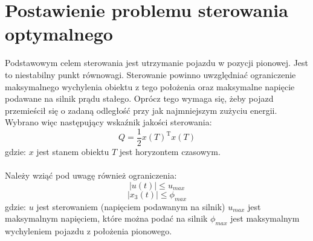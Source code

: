 \section{Postawienie problemu sterowania optymalnego}
\label{sec:sterowanie_optymalne}

Podstawowym celem sterowania jest utrzymanie pojazdu w pozycji pionowej. Jest to niestabilny punkt równowagi. Sterowanie powinno uwzględniać ograniczenie maksymalnego wychylenia obiektu z tego położenia oraz maksymalne napięcie podawane na silnik prądu stałego. Oprócz tego wymaga się, żeby pojazd przemieścił się o zadaną odległość przy jak najmniejszym zużyciu energii. Wybrano więc następujący wskaźnik jakości sterowania:
\begin{equation}
Q=\frac{1}{2}x(T)^\text{T}x(T)
\end{equation}
\noindent gdzie:\newline
\(x\) jest stanem obiektu\newline
\(T\) jest horyzontem czasowym.

\paragraph*{}
Należy wziąć pod uwagę również ograniczenia:
\begin{equation}
|u(t)|\leqslant u_{max}
\label{eq:u_max}
\end{equation}
\begin{equation}
|x_3(t)|\leqslant \phi_{max}
\label{eq:phi_max}
\end{equation}
\noindent gdzie:\newline
\(u\) jest sterowaniem (napięciem podawanym na silnik)\newline
\(u_{max}\) jest maksymalnym napięciem, które można podać na silnik\newline
\(\phi_{max}\) jest maksymalnym wychyleniem pojazdu z położenia pionowego.

